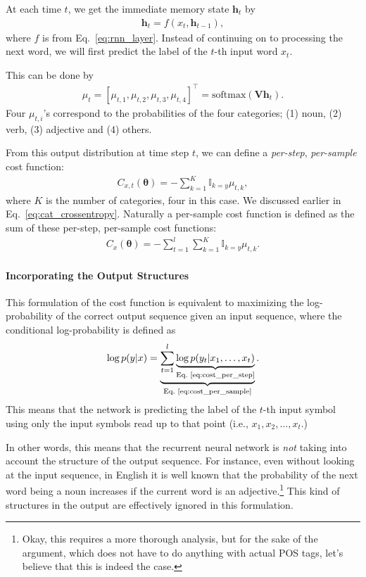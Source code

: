 \documentclass{report}
\newcommand{\softmax}{\text{softmax}}
\newcommand{\vect}[1]{\mathbf{#1}}
\newcommand{\vects}[1]{\boldsymbol{#1}}
\newcommand{\matr}[1]{\mathbf{#1}}
\newcommand{\vh}[0]{\vect{h}}
\newcommand{\mV}[0]{\matr{V}}
\newcommand{\TT}[0]{\vects{\theta}}
\newcommand{\II}[0]{\mathbb{I}}
\begin{document}
At each time $t$, we get the immediate memory state $\vh_t$ by
\begin{align}
    \label{eq:rnn_h_x}
    \vh_t = f(x_t, \vh_{t-1}),
\end{align}
where $f$ is from Eq.~\eqref{eq:rnn_layer}. Instead of continuing on to
processing the next word, we will first predict the label of the $t$-th input
word $x_t$.

This can be done by 
\begin{align}
    \label{eq:rnn_y_h}
    \mu_t = \left[ \mu_{t,1}, \mu_{t,2}, \mu_{t,3}, \mu_{t,4} \right]^\top =
    \softmax(\mV \vh_{t}).
\end{align}
Four $\mu_{t,i}$'s correspond to the probabilities of the four categories; (1)
noun, (2) verb, (3) adjective and (4) others.

From this output distribution at time step $t$, we can define a {\em per-step},
{\em per-sample} cost function:
\begin{align}
    \label{eq:cost_per_step}
    C_{x,t}(\TT) = -\sum_{k=1}^K \II_{k=y} \mu_{t,k},
\end{align}
where $K$ is the number of categories, four in this case.  We discussed earlier
in Eq.~\eqref{eq:cat_crossentropy}.
Naturally a per-sample cost function is defined as the sum of these per-step,
per-sample cost functions:
\begin{align}
    \label{eq:cost_per_sample}
    C_x(\TT) = -\sum_{t=1}^l \sum_{k=1}^K \II_{k=y} \mu_{t,k}.
\end{align}

\paragraph{Incorporating the Output Structures} 
This formulation of the cost function is equivalent to maximizing the
log-probability of the correct output sequence given an input sequence, where
the conditional log-probability is defined as
\begin{align}
    \label{eq:log_y_x_seq}
    \log p(y|x) = \underbrace{\sum_{t=1}^l \underbrace{\log
    p(y_t|x_1,\ldots,x_t)}_{\text{Eq.~\eqref{eq:cost_per_step}}}}_{
        \text{Eq.~\eqref{eq:cost_per_sample}}}.
\end{align}
This means that the network is predicting the label of the $t$-th input symbol
using only the input symbols read up to that point (i.e., $x_1, x_2, \ldots,
x_t$.)

In other words, this means that the recurrent neural network is {\em not} taking
into account the structure of the output sequence. For instance, even without
looking at the input sequence, in English it is well known that the probability
of the next word being a noun increases if the current word is an
adjective.\footnote{
    Okay, this requires a more thorough analysis, but for the sake of the
    argument, which does not have to do anything with actual POS tags, let's
    believe that this is indeed the case.
} This kind of structures in the output are effectively ignored in this
formulation.
\end{document}
